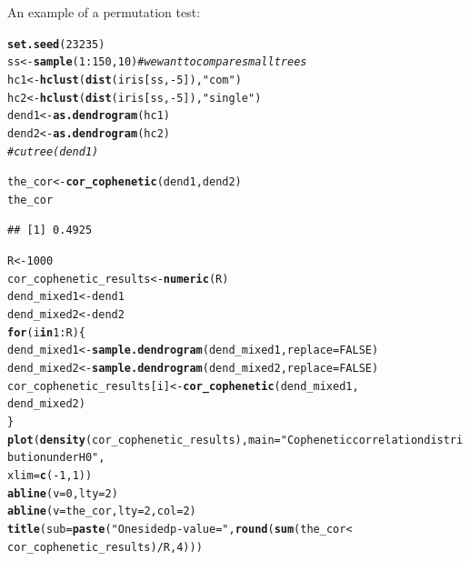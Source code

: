 \documentclass[shortnames,nojss,article]{jss}\usepackage[]{graphicx}\usepackage[]{color}
\makeatletter
\newcommand{\hlnum}[1]{\textcolor[rgb]{0.686,0.059,0.569}{#1}}%
\newcommand{\hlstr}[1]{\textcolor[rgb]{0.192,0.494,0.8}{#1}}%
\newcommand{\hlcom}[1]{\textcolor[rgb]{0.678,0.584,0.686}{\textit{#1}}}%
\newcommand{\hlopt}[1]{\textcolor[rgb]{0,0,0}{#1}}%
\newcommand{\hlstd}[1]{\textcolor[rgb]{0.345,0.345,0.345}{#1}}%
\newcommand{\hlkwa}[1]{\textcolor[rgb]{0.161,0.373,0.58}{\textbf{#1}}}%
\newcommand{\hlkwb}[1]{\textcolor[rgb]{0.69,0.353,0.396}{#1}}%
\newcommand{\hlkwc}[1]{\textcolor[rgb]{0.333,0.667,0.333}{#1}}%
\newcommand{\hlkwd}[1]{\textcolor[rgb]{0.737,0.353,0.396}{\textbf{#1}}}%
\newenvironment{kframe}{%
 \def\at@end@of@kframe{}%
 \ifinner\ifhmode%
  \def\at@end@of@kframe{\end{minipage}}%
  \begin{minipage}{\columnwidth}%
 \fi\fi%
 \def\FrameCommand##1{\hskip\@totalleftmargin \hskip-\fboxsep
 \colorbox{shadecolor}{##1}\hskip-\fboxsep
     \hskip-\linewidth \hskip-\@totalleftmargin \hskip\columnwidth}%
 \MakeFramed {\advance\hsize-\width
   \@totalleftmargin\z@ \linewidth\hsize
   \@setminipage}}%
 {\par\unskip\endMakeFramed%
 \at@end@of@kframe}
\newenvironment{knitrout}{}{} %
\makeatother
\begin{document}
An example of a permutation test:

\begin{knitrout}
\color{fgcolor}\begin{kframe}
\begin{alltt}
\hlkwd{set.seed}\hlstd{(}\hlnum{23235}\hlstd{)}
\hlstd{ss} \hlkwb{<-} \hlkwd{sample}\hlstd{(}\hlnum{1}\hlopt{:}\hlnum{150}\hlstd{,} \hlnum{10}\hlstd{)}  \hlcom{# we want to compare small trees}
\hlstd{hc1} \hlkwb{<-} \hlkwd{hclust}\hlstd{(}\hlkwd{dist}\hlstd{(iris[ss,} \hlopt{-}\hlnum{5}\hlstd{]),} \hlstr{"com"}\hlstd{)}
\hlstd{hc2} \hlkwb{<-} \hlkwd{hclust}\hlstd{(}\hlkwd{dist}\hlstd{(iris[ss,} \hlopt{-}\hlnum{5}\hlstd{]),} \hlstr{"single"}\hlstd{)}
\hlstd{dend1} \hlkwb{<-} \hlkwd{as.dendrogram}\hlstd{(hc1)}
\hlstd{dend2} \hlkwb{<-} \hlkwd{as.dendrogram}\hlstd{(hc2)}
\hlcom{# cutree(dend1)}

\hlstd{the_cor} \hlkwb{<-} \hlkwd{cor_cophenetic}\hlstd{(dend1, dend2)}
\hlstd{the_cor}
\end{alltt}
\begin{verbatim}
## [1] 0.4925
\end{verbatim}
\begin{alltt}
\hlstd{R} \hlkwb{<-} \hlnum{1000}
\hlstd{cor_cophenetic_results} \hlkwb{<-} \hlkwd{numeric}\hlstd{(R)}
\hlstd{dend_mixed1} \hlkwb{<-} \hlstd{dend1}
\hlstd{dend_mixed2} \hlkwb{<-} \hlstd{dend2}
\hlkwa{for} \hlstd{(i} \hlkwa{in} \hlnum{1}\hlopt{:}\hlstd{R) \{}
    \hlstd{dend_mixed1} \hlkwb{<-} \hlkwd{sample.dendrogram}\hlstd{(dend_mixed1,} \hlkwc{replace} \hlstd{=} \hlnum{FALSE}\hlstd{)}
    \hlstd{dend_mixed2} \hlkwb{<-} \hlkwd{sample.dendrogram}\hlstd{(dend_mixed2,} \hlkwc{replace} \hlstd{=} \hlnum{FALSE}\hlstd{)}
    \hlstd{cor_cophenetic_results[i]} \hlkwb{<-} \hlkwd{cor_cophenetic}\hlstd{(dend_mixed1,}
        \hlstd{dend_mixed2)}
\hlstd{\}}
\hlkwd{plot}\hlstd{(}\hlkwd{density}\hlstd{(cor_cophenetic_results),} \hlkwc{main} \hlstd{=} \hlstr{"Cophenetic correlation distribution under H0"}\hlstd{,}
    \hlkwc{xlim} \hlstd{=} \hlkwd{c}\hlstd{(}\hlopt{-}\hlnum{1}\hlstd{,} \hlnum{1}\hlstd{))}
\hlkwd{abline}\hlstd{(}\hlkwc{v} \hlstd{=} \hlnum{0}\hlstd{,} \hlkwc{lty} \hlstd{=} \hlnum{2}\hlstd{)}
\hlkwd{abline}\hlstd{(}\hlkwc{v} \hlstd{= the_cor,} \hlkwc{lty} \hlstd{=} \hlnum{2}\hlstd{,} \hlkwc{col} \hlstd{=} \hlnum{2}\hlstd{)}
\hlkwd{title}\hlstd{(}\hlkwc{sub} \hlstd{=} \hlkwd{paste}\hlstd{(}\hlstr{"One sided p-value ="}\hlstd{,} \hlkwd{round}\hlstd{(}\hlkwd{sum}\hlstd{(the_cor} \hlopt{<}
    \hlstd{cor_cophenetic_results)}\hlopt{/}\hlstd{R,} \hlnum{4}\hlstd{)))}
\end{alltt}
\end{kframe}


\end{knitrout}
\end{document}
